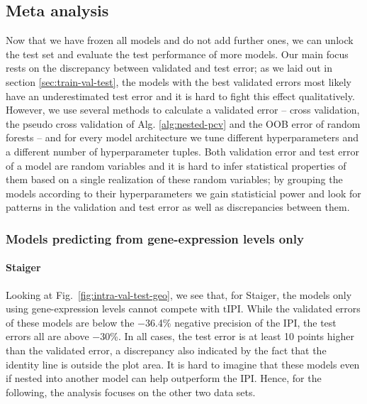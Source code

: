\subsection{Meta analysis}

Now that we have frozen all models and do not add further ones, we can unlock the test set and 
evaluate the test performance of more models. Our main focus rests on the discrepancy between 
validated and test error; as we laid out in section \ref{sec:train-val-test}, the models with the 
best validated errors most likely have an underestimated test error and it is hard to fight this 
effect qualitatively. However, we use several methods to calculate a validated error -- cross 
validation, the pseudo cross validation of Alg. \ref{alg:nested-pcv} and the OOB error of random 
forests -- and for every model architecture we tune different hyperparameters and a different 
number of hyperparameter tuples. Both validation error and test error of a model are random 
variables and it is hard to infer statistical properties of them based on a single realization of 
these random variables; by grouping the models according to their hyperparameters we gain 
statisticial power and look for patterns in the validation and test error as well as 
discrepancies between them.

\subsubsection{Models predicting from gene-expression levels only}



\paragraph{Staiger}
Looking at Fig.\ \ref{fig:intra-val-test-geo}, we see that, for Staiger, the models only using 
gene-expression levels cannot compete with $\text{tIPI}$. While the validated errors of these models are 
below the \num{-36.4}\% negative precision of the IPI, the test errors all are above \num{-30}\%. 
In all cases, the test error is at least 10 points higher than the validated error, a discrepancy 
also indicated by the fact that the identity line is outside the plot area. It is hard to imagine that 
these models even if nested into another model can help outperform the IPI. Hence, for the 
following, the analysis focuses on the other two data sets.


